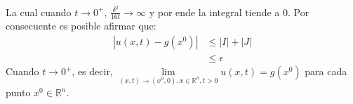 \begin{homeworkProblem}
\begin{solucion}
\begin{enumerate}
\begin{align*}
      \end{align*}
      La cual cuando $t\rightarrow 0^+$, $\frac{\delta^2}{16t}\rightarrow\infty$ y por ende la integral tiende a 0. Por consecuente es posible afirmar que:
      \begin{align*}
        |u(x,t)-g(x^0)|&\leq |I|+|J|\\
        &\leq \epsilon
      \end{align*}
      Cuando $t\rightarrow 0^+$, es decir, $\underset{(x,t)\rightarrow(x^0,0),x\in\mathbb{R}^{n},t>0}{\lim}u(x,t)=g(x^0)$ para cada punto $x^0\in\mathbb{R}^{n}$. 
    \end{enumerate}
  \end{solucion}
\end{homeworkProblem}
